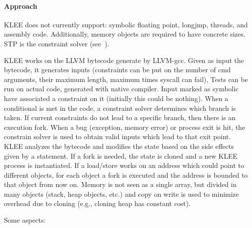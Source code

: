 \paragraph{Approach}

KLEE does not currently support: symbolic floating point, longjmp, threads, and assembly code. Additionally, memory objects are required to have concrete sizes. STP is the constraint solver (see~\cite{EXE-CCS06}).

KLEE works on the LLVM bytecode generate by LLVM-gcc. Given as input the bytecode, it generates inputs (constraints can be put on the number of cmd arguments, their maximum length, maximum times syscall can fail), Tests can be run on actual code, generated with native compiler. Input marked as symbolic have associated a constraint on it (initially this could be nothing). When a conditional is met in the code, a constraint solver determines which branch is taken. If current constraints do not lead to a specific branch, then there is an execution fork. When a bug (exception, memory error) or process exit is hit, the constrain solver is used to obtain valid inputs which lead to that exit point. KLEE analyzes the bytecode and modifies the state based on the side effects given by a statement. If a fork is needed, the state is cloned and a new KLEE process is instantiated. If a load/store works on an address which could point to different objects, for each object a fork is executed and the address is bounded to that object from now on. Memory is not seen as a single array, but divided in many objects (stack, heap objects, etc.) and copy on write is used to minimize overhead due to cloning (e.g., cloning heap has constant cost).

Some aspects:

